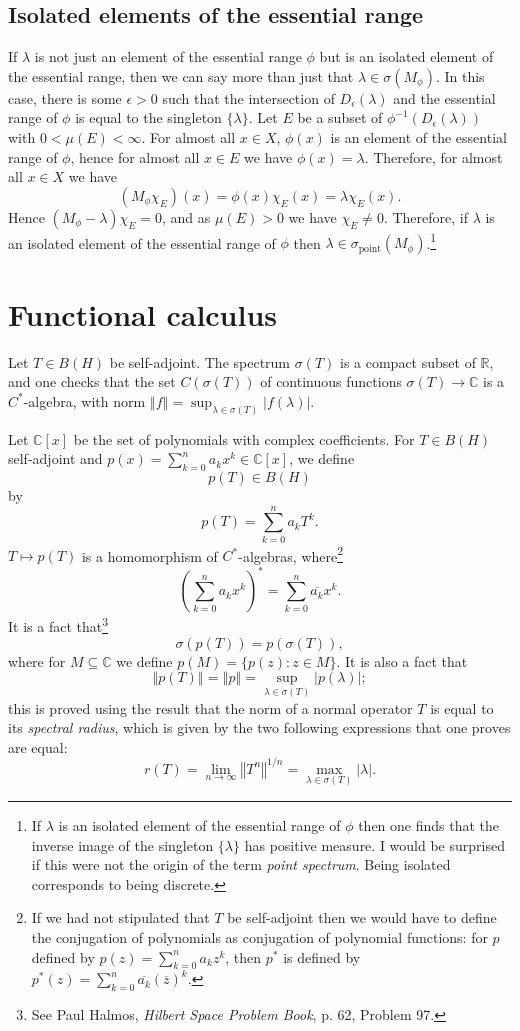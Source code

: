 \documentclass{article}
\newcommand{\point}{\sigma_{\textrm{point}}}
\newcommand{\norm}[1]{\left\Vert #1 \right\Vert}
\begin{document}
\subsection{Isolated elements of the essential range}
If  $\lambda$ is not just an element of the essential range $\phi$ 
 but is an isolated element of the essential range, then we can say more
than just that $\lambda \in \sigma(M_\phi)$. In this case, there is some $\epsilon>0$ such that the intersection
of
$D_\epsilon(\lambda)$  and the essential range of $\phi$ is equal to the singleton $\{\lambda\}$. Let $E$ be a subset of $\phi^{-1}(D_\epsilon(\lambda))$ with
$0<\mu(E)<\infty$.  For almost all $x \in X$, $\phi(x)$ is an element of the essential range of $\phi$, hence for almost all  $x \in E$ we have $\phi(x)=\lambda$. Therefore,
 for almost all  $x \in X$ we have
\[
(M_\phi \chi_E)(x)=\phi(x) \chi_E(x)=\lambda \chi_E(x).
\]
Hence $(M_\phi - \lambda)\chi_E=0$, and as $\mu(E)>0$ we have $\chi_E \neq 0$. Therefore, if $\lambda$ is an isolated element of the essential range of $\phi$ then
$\lambda \in \point(M_\phi)$.\footnote{If $\lambda$ is an isolated element of the essential range of $\phi$ then 
one finds that the inverse image of the singleton
$\{\lambda\}$ 
has positive measure.
I would be surprised if this were not the origin of the term {\em point spectrum}. Being isolated corresponds to being discrete.}






\section{Functional calculus}
Let $T \in B(H)$ be self-adjoint. The spectrum $\sigma(T)$ is a compact
subset of $\mathbb{R}$, and one checks that the set $C(\sigma(T))$ 
of continuous functions $\sigma(T) \to \mathbb{C}$ is a $C^*$-algebra, with norm
$\norm{f}=\sup_{\lambda \in \sigma(T)} |f(\lambda)|$. 

Let $\mathbb{C}[x]$ be the set of polynomials with complex coefficients. For
$T \in B(H)$ self-adjoint and $p(x)=\sum_{k=0}^n a_k x^k \in \mathbb{C}[x]$, we define 
\[
p(T) \in B(H)
\]
by
\[
p(T)=\sum_{k=0}^n a_k T^k.
\]
$T \mapsto p(T)$ is a homomorphism of $C^*$-algebras, where\footnote{If we had not stipulated that $T$ be self-adjoint then
we would have to define the conjugation of polynomials as conjugation of polynomial functions: for $p$ defined by
$p(z)=\sum_{k=0}^n a_k z^k$, then
$p^*$ is defined by $p^*(z)=\sum_{k=0}^n \overline{a_k} (\overline{z})^k$.}
\[
\left(\sum_{k=0}^n a_k x^k \right)^*=\sum_{k=0}^n \overline{a_k} x^k.
\]
It is a fact that\footnote{See Paul Halmos, {\em Hilbert Space Problem Book}, 
p. 62, Problem 97.}
\[
\sigma(p(T))=p(\sigma(T)),
\]
 where for $M \subseteq \mathbb{C}$
we define
$p(M)=\{p(z):z \in M\}$. It is also a fact that 
\[
\norm{p(T)}=\norm{p}=\sup_{\lambda \in \sigma(T)} |p(\lambda)|;
\]
this is proved using the result that the norm of a normal operator $T$ is equal to its {\em spectral radius}, which is given by the two
following expressions that one proves are equal:
\[
r(T)=\lim_{n \to \infty} \norm{T^n}^{1/n}=\max_{\lambda \in \sigma(T)} |\lambda|.
\]
\end{document}
